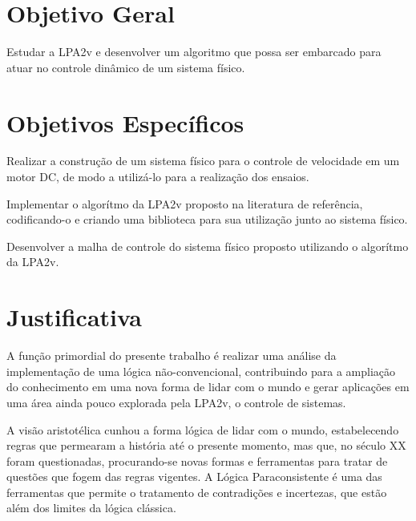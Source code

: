 \section{Objetivo Geral}
Estudar a LPA2v e desenvolver um algoritmo que possa ser embarcado para atuar no controle dinâmico de um sistema físico.




\section{Objetivos Específicos}


Realizar a construção de um sistema físico para o controle de velocidade em um motor DC, de modo a utilizá-lo para a realização dos ensaios.

Implementar o algorítmo da LPA2v proposto na literatura de referência, codificando-o e criando uma biblioteca para sua utilização junto ao sistema físico.

Desenvolver a malha de controle do sistema físico proposto utilizando o algorítmo da LPA2v.




\section{Justificativa}



A função primordial do presente trabalho é realizar uma análise da implementação de uma lógica não-convencional, 
contribuindo para a ampliação do conhecimento em uma nova forma de lidar com o mundo e
gerar aplicações em uma área ainda pouco explorada pela LPA2v, o controle de sistemas. 


A visão aristotélica cunhou a forma lógica de lidar com o mundo, 
estabelecendo regras que permearam a história até o presente momento,
mas que, no século XX foram questionadas, procurando-se novas formas e ferramentas para tratar de questões que fogem das regras vigentes. 
A Lógica Paraconsistente é uma das ferramentas que permite o tratamento de contradições e incertezas,
que estão além dos limites da lógica clássica.

